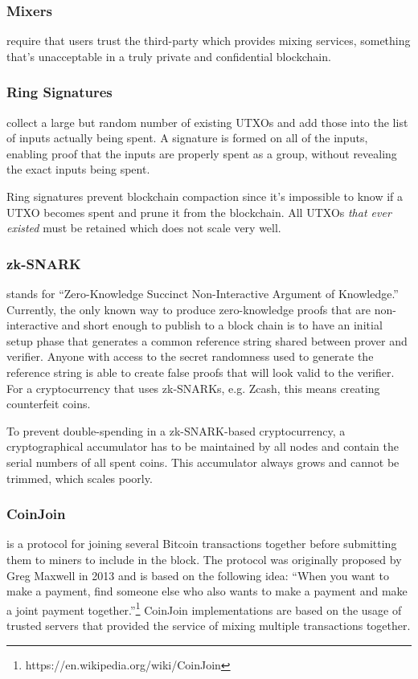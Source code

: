 \documentclass[8pt,fleqn,openany]{book}
\begin{document}
\subsubsection{Mixers} require that users trust the third-party which provides mixing services, something that's unacceptable in a truly private and confidential blockchain.

\subsubsection{Ring Signatures} collect a large but random number of existing UTXOs and add those into the list of inputs actually being spent. A signature is formed on all of the inputs, enabling proof that the inputs are properly spent as a group, without revealing the exact inputs being spent. 

Ring signatures prevent blockchain compaction since it's impossible to know if a UTXO becomes spent and prune it from the blockchain. All UTXOs \textit{that ever existed} must be retained which does not scale very well.

\subsubsection{zk-SNARK} stands for ``Zero-Knowledge Succinct Non-Interactive Argument of Knowledge.'' Currently, the only known way to produce zero-knowledge proofs that are non-interactive and short enough to publish to a block chain is to have an initial setup phase that generates a common reference string shared between prover and verifier. Anyone with access to the secret randomness used to generate the reference string is able to create false proofs that will look valid to the verifier. For a cryptocurrency that uses zk-SNARKs, e.g. Zcash, this means creating counterfeit coins. 

To prevent double-spending in a zk-SNARK-based cryptocurrency, a cryptographical accumulator has to be maintained by all nodes and contain the serial numbers of all spent coins. This accumulator always grows and cannot be trimmed, which scales poorly.

\subsubsection{CoinJoin} is a protocol for joining several Bitcoin transactions together before submitting them to miners to include in the block. The protocol was originally proposed by Greg Maxwell in 2013 and is based on the following idea: ``When you want to make a payment, find someone else who also wants to make a payment and make a joint payment together.''\footnote{https://en.wikipedia.org/wiki/CoinJoin} CoinJoin implementations are based on the usage of trusted servers that provided the service of mixing multiple transactions together.
\end{document}
